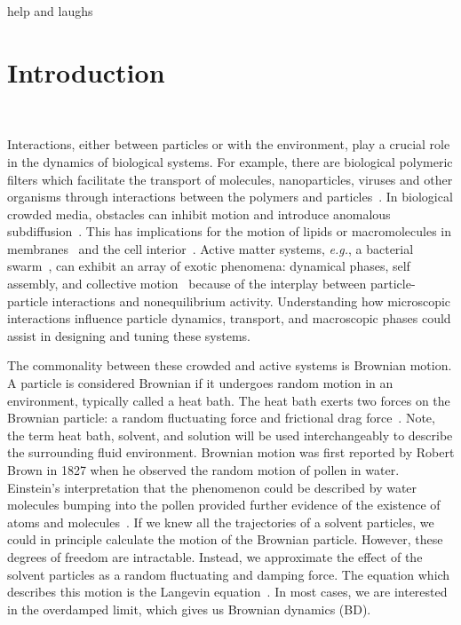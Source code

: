 help and laughs\chapter{Introduction}~\label{ch01_introduction}

Interactions, either between particles or with the environment, play a crucial
role in the dynamics of biological systems.  For example, there are biological
polymeric filters which facilitate the transport of molecules, nanoparticles,
viruses and other organisms through interactions between the polymers and
particles~\cite{witten_particle_17}.  In biological crowded media, obstacles can
inhibit motion and introduce anomalous subdiffusion~\cite{hofling_anomalous_13}.
This has implications for the motion of lipids or macromolecules in
membranes~\cite{schutz_singlemolecule_97,schutz_properties_00,
  nicolau_sources_07, weigel_ergodic_11, javanainen_anomalous_13,
  krapf_mechanisms_15, jeon_protein_16, sadegh_plasma_17} and the cell
interior~\cite{stylianidou_cytoplasmic_14}.  Active matter systems,
\textit{e.g.}, a bacterial swarm~\cite{zhang_collective_10,
  cisneros_dynamics_11,thutupalli_directional_15}, can exhibit an array of
exotic phenomena: dynamical phases, self assembly, and collective
motion~\cite{marchetti_hydrodynamics_13} because of the interplay between
particle-particle interactions and nonequilibrium activity.  Understanding how
microscopic interactions influence particle dynamics, transport, and macroscopic
phases could assist in designing and tuning these systems.

The commonality between these crowded and active systems is Brownian motion.  A
particle is considered Brownian if it undergoes random motion in an environment,
typically called a heat bath.  The heat bath exerts two forces on the Brownian
particle: a random fluctuating force and frictional
drag force~\cite{zwanzig_nonequilibrium_01}. Note, the term heat bath, solvent, and
solution will be used interchangeably to describe the surrounding fluid
environment.  Brownian motion was first reported by Robert Brown in 1827 when he
observed the random motion of pollen in water.  Einstein's interpretation that
the phenomenon could be described by water molecules  bumping into the pollen
provided further evidence of the existence of atoms and
molecules~\cite{einstein_uber_05}. If we knew all the trajectories of a solvent
particles, we could in principle calculate the motion of the Brownian particle.
However, these degrees of freedom are intractable.  Instead, we approximate the
effect of the solvent particles as a random fluctuating and damping force.  The
equation which describes this motion is the Langevin
equation~\cite{zwanzig_nonequilibrium_01}. In most cases, we are interested in
the overdamped limit, which gives us Brownian dynamics (BD).

